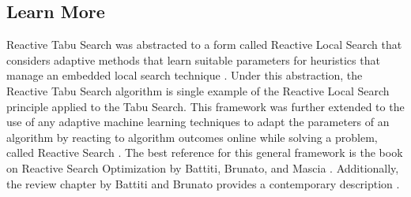 % 
% 
\subsection{Learn More}
Reactive Tabu Search was abstracted to a form called Reactive Local Search that considers adaptive methods that learn suitable parameters for heuristics that manage an embedded local search technique \cite{Battiti1995, Battiti2001}. Under this abstraction, the Reactive Tabu Search algorithm is single example of the Reactive Local Search principle applied to the Tabu Search. 
This framework was further extended to the use of any adaptive machine learning techniques to adapt the parameters of an algorithm by reacting to algorithm outcomes online while solving a problem, called Reactive Search \cite{Battiti1996}. The best reference for this general framework is the book on Reactive Search Optimization by Battiti, Brunato, and Mascia \cite{Battiti2008}. Additionally, the review chapter by Battiti and Brunato provides a contemporary description \cite{Battiti2009}.


